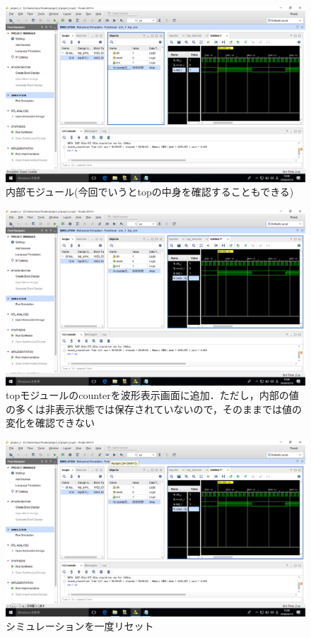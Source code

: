 \documentclass[a4paper,dvipdfmx]{jsarticle}
\begin{document}
 \begin{figure}[H]
  \begin{center}
   \includegraphics[width=.8\textwidth]{chapter04_figures/VirtualBox_Windows10_19_03_2018_12_08_38.png}
  \end{center}
  \caption{内部モジュール(今回でいうとtopの中身を確認することもできる)}
 \end{figure}

 \begin{figure}[H]
  \begin{center}
   \includegraphics[width=.8\textwidth]{chapter04_figures/VirtualBox_Windows10_19_03_2018_12_08_48.png}
  \end{center}
  \caption{topモジュールのcounterを波形表示画面に追加．ただし，内部の値の多くは非表示状態では保存されていないので，そのままでは値の変化を確認できない}
 \end{figure}

 \begin{figure}[H]
  \begin{center}
   \includegraphics[width=.8\textwidth]{chapter04_figures/VirtualBox_Windows10_19_03_2018_12_08_52.png}
  \end{center}
  \caption{シミュレーションを一度リセット}
 \end{figure}
\end{document}

